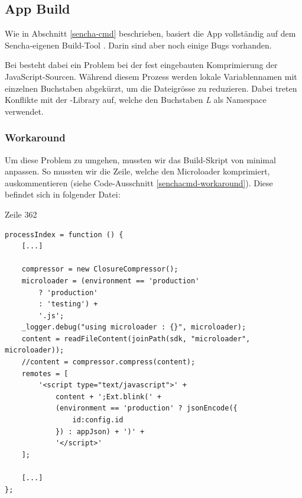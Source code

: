 \subsection{App Build}
Wie in Abschnitt \ref{sencha-cmd} beschrieben, basiert die App vollständig auf dem Sencha-eigenen Build-Tool . Darin sind aber noch einige Bugs vorhanden.

Bei \kort{} besteht dabei ein Problem bei der fest eingebauten Komprimierung der JavaScript-Sourcen.
Während diesem Prozess werden lokale Variablennamen mit einzelnen Buchstaben abgekürzt, um die Dateigrösse zu reduzieren.
Dabei treten Konflikte mit der -Library auf, welche den Buchstaben \emph{L} als Namespace verwendet.

\subsubsection{Workaround}
Um diese Problem zu umgehen, mussten wir das Build-Skript von  minimal anpassen.
So mussten wir die Zeile, welche den \gls{Microloader} komprimiert, auskommentieren (siehe Code-Ausschnitt \ref{senchacmd-workaround}).
Diese befindet sich in folgender Datei:

 Zeile 362

\lstset{language=JavaScript}
\begin{lstlisting}[caption=Sencha Cmd Workaround, label=senchacmd-workaround]
processIndex = function () {
	[...]
	
	compressor = new ClosureCompressor();
	microloader = (environment == 'production'
		? 'production'
		: 'testing') +
		'.js';
	_logger.debug("using microloader : {}", microloader);
	content = readFileContent(joinPath(sdk, "microloader", microloader));
	//content = compressor.compress(content);
	remotes = [
		'<script type="text/javascript">' +
			content + ';Ext.blink(' +
			(environment == 'production' ? jsonEncode({
				id:config.id
			}) : appJson) + ')' +
			'</script>'
	];
	
	[...]
};
\end{lstlisting}